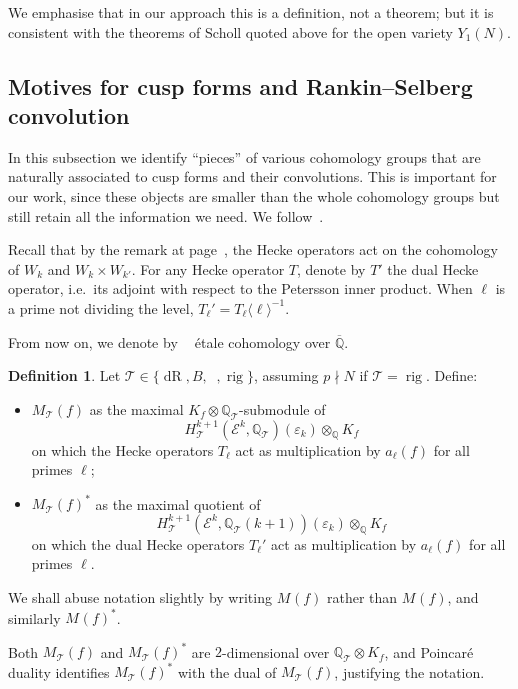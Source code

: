 \documentclass[11pt, a4paper, reqno]{amsart}
\theoremstyle{definition}
\newtheorem{definition}{Definition}[subsection]
\theoremstyle{plain}
\theoremstyle{remark}
\DeclareMathOperator{\et}{\acute{e}t}
\DeclareMathOperator{\etbar}{\overline{\acute{e}t}}
\DeclareMathOperator{\rig}{rig}
\DeclareMathOperator{\dR}{dR}
\newcommand{\numberset}{\mathbb}
\newcommand{\Q}{\numberset{Q}}
\renewcommand{\epsilon}{\varepsilon}
\newcommand{\Ell}{\mathcal{E}}
\newcommand{\theory}{\mathcal{T}}
\begin{document}
  We emphasise that in our approach this is a definition, not a theorem; but it is consistent with the theorems of Scholl quoted above for the open variety $Y_1(N)$.

 \subsection{Motives for cusp forms and Rankin--Selberg convolution}
  \label{subsec:motives}

  In this subsection we identify ``pieces'' of various cohomology groups that are naturally associated to cusp forms and their convolutions. This is important for our work, since these objects are smaller than the whole cohomology groups but still retain all the information we need. We follow~\cite[§4]{scholl90}.

  Recall that by the remark at page~\pageref{remark:hecke-ops}, the Hecke operators act on the cohomology of $W_k$ and $W_k\times W_{k'}$. For any Hecke operator $T$, denote by $T'$ the dual Hecke operator, i.e.\ its adjoint with respect to the Petersson inner product. When $\ell$ is a prime not dividing the level, $T_\ell' = T_\ell\langle \ell \rangle^{-1}$.

  From now on, we denote by $\etbar$ étale cohomology over $\overline{\Q}$.
  \begin{definition}
   Let $\theory \in \{\dR, B, \etbar, \rig\}$, assuming $p \nmid N$ if $\theory = \rig$. Define:
   \begin{itemize}
    \item $M_{\theory}(f)$ as the maximal $K_f\otimes \Q_{\theory}$-submodule of
    \[ H^{k+1}_{\theory}(\Ell^k,\Q_{\theory})(\epsilon_k) \otimes_{\Q} K_f \]
    on which the Hecke operators $T_\ell$ act as multiplication by $a_\ell(f)$ for all primes $\ell$;
    \item $M_{\theory}(f)^*$ as the maximal quotient of
    \[ H^{k+1}_{\theory}(\Ell^k,\Q_{\theory}(k+1))(\epsilon_k) \otimes_{\Q} K_f \]
    on which the dual Hecke operators $T_\ell'$ act as multiplication by $a_\ell(f)$ for all primes $\ell$.
   \end{itemize}
   We shall abuse notation slightly by writing $M_{\et}(f)$ rather than $M_{\etbar}(f)$, and similarly $M_{\et}(f)^*$.
  \end{definition}

  Both $M_{\theory}(f)$ and $M_{\theory}(f)^*$ are $2$-dimensional over $\Q_\theory \otimes K_f$, and Poincar\'e duality identifies $M_{\theory}(f)^*$ with the dual of $M_{\theory}(f)$, justifying the notation.
\end{document}
